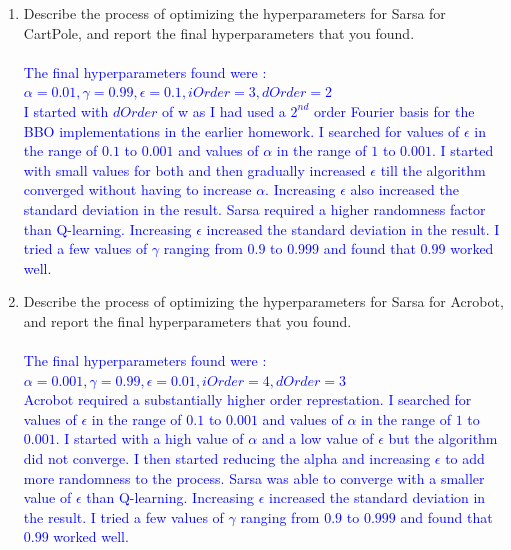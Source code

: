 \documentclass[]{article}
\begin{document}
\begin{enumerate}
    \item Describe the process of optimizing the hyperparameters for Sarsa for CartPole, and report the final hyperparameters that you found.
    \\\\
    \textcolor{blue}{
    	The final hyperparameters found were :\\
    	$
    	\alpha  = 0.01,
    	\gamma = 0.99,
    	\epsilon = 0.1,
    	iOrder = 3,
    	dOrder = 2
    	$\\
    	I started with $dOrder$ of w as I had used a $2^{nd}$ order Fourier basis for the BBO implementations in the earlier homework. I searched for values of $\epsilon$ in the range of $0.1$ to $0.001$ and values of $\alpha$ in the range of $1$ to $0.001$.  I started with small values for both and then gradually increased $\epsilon$ till the algorithm converged without having to increase $\alpha$. Increasing $\epsilon$ also increased the standard deviation in the result. Sarsa required a higher randomness factor than Q-learning. Increasing $\epsilon$ increased the standard deviation in the result. I tried a few values of $\gamma$ ranging from $0.9$ to $0.999$ and found that $0.99$ worked well.
    }

    \item Describe the process of optimizing the hyperparameters for Sarsa for Acrobot, and report the final hyperparameters that you found.
    \\\\
    \textcolor{blue}{
    	The final hyperparameters found were :\\
    	$
    	\alpha  = 0.001,
    	\gamma = 0.99,
    	\epsilon = 0.01,
    	iOrder = 4,
    	dOrder = 3
    	$\\
    	Acrobot required a substantially higher order represtation. I searched for values of $\epsilon$ in the range of $0.1$ to $0.001$ and values of $\alpha$ in the range of $1$ to $0.001$. I started with a high value of $\alpha$ and a low value of $\epsilon$ but the algorithm did not converge. I then started reducing the alpha and increasing $\epsilon$ to add more randomness to the process. Sarsa was able to converge with a smaller value of $\epsilon$ than Q-learning. Increasing $\epsilon$ increased the standard deviation in the result. I tried a few values of $\gamma$ ranging from $0.9$ to $0.999$ and found that $0.99$ worked well.
    }


\end{enumerate}
\end{document}
